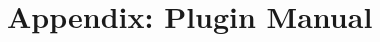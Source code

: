 \documentclass{article}
\begin{document}
%
%
%
%
%
%
%

\appendix
\section{Appendix:  Plugin Manual}
\end{document}
